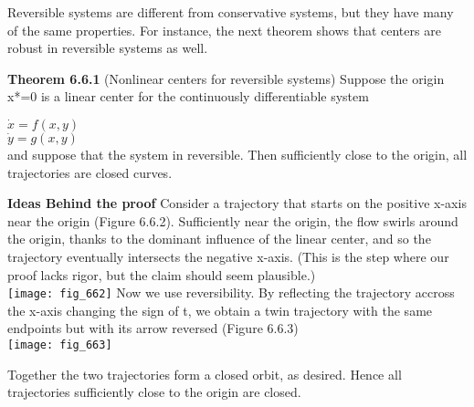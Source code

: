 \documentclass{article}
\newcommand\tab[1][1cm]{\hspace*{#1}}
\begin{document}
Reversible systems are different from conservative systems, but they have many of the same properties. For instance, the next theorem shows that centers are robust in reversible systems as well. 

\textbf{Theorem 6.6.1} (Nonlinear centers for reversible systems) Suppose the origin x*=0 is a linear center for the continuously differentiable system \\ \tab \tab

$\dot{x}=f(x,y)$ \\ \tab \tab
$\dot{y}=g(x,y)$ \\
and suppose that the system in reversible. Then sufficiently close to the origin, all trajectories are closed curves.

\textbf {Ideas Behind the proof} Consider a trajectory that starts on the positive x-axis near the origin (Figure 6.6.2). Sufficiently near the origin, the flow swirls around the origin, thanks to the dominant influence of the linear center, and so the trajectory eventually intersects the negative x-axis. (This is the step where our proof lacks rigor, but the claim should seem plausible.) \\

\texttt{[image: fig\_662]} 
Now we use reversibility. By reflecting the trajectory accross the x-axis changing the sign of t, we obtain a twin trajectory with the same endpoints but with its arrow reversed (Figure 6.6.3)
\\
\texttt{[image: fig\_663]}

Together the two trajectories form a closed orbit, as desired. Hence all trajectories sufficiently close to the origin are closed.
\end{document}
